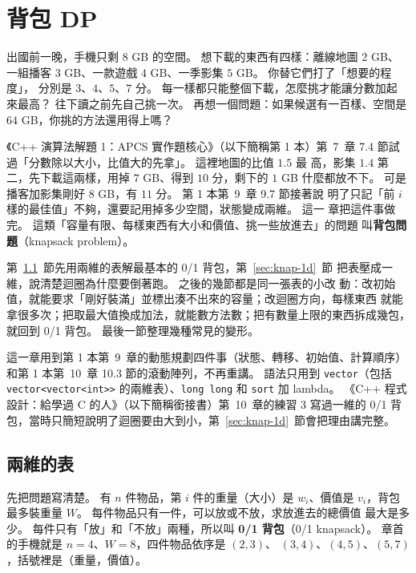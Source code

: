 \chapter{背包 DP}
\label{ch:knapsack}

出國前一晚，手機只剩 $8$ GB 的空間。 想下載的東西有四樣：離線地圖 $2$ GB、
一組播客 $3$ GB、一款遊戲 $4$ GB、一季影集 $5$ GB。 你替它們打了「想要的程度」，
分別是 $3$、$4$、$5$、$7$ 分。 每一樣都只能整個下載，怎麼挑才能讓分數加起
來最高？ 往下讀之前先自己挑一次。 再想一個問題：如果候選有一百樣、空間是
$64$ GB，你挑的方法還用得上嗎？

《C++ 演算法解題 1：APCS 實作題核心》（以下簡稱第 1 本）第~7~章 7.4 節試過「分數除以大小，比值大的先拿」。 這裡地圖的比值 $1.5$ 最
高，影集 $1.4$ 第二，先下載這兩樣，用掉 $7$ GB、得到 $10$ 分，剩下的 $1$ GB
什麼都放不下。 可是播客加影集剛好 $8$ GB，有 $11$ 分。 第 1 本第~9~章 9.7 節接著說
明了只記「前 $i$ 樣的最佳值」不夠，還要記用掉多少空間，狀態變成兩維。 這一
章把這件事做完。 這類「容量有限、每樣東西有大小和價值、挑一些放進去」的問題
叫\textbf{背包問題}（knapsack problem）。

第~\ref{sec:knap-01}~節先用兩維的表解最基本的 0/1 背包，第~\ref{sec:knap-1d}~節
把表壓成一維，說清楚迴圈為什麼要倒著跑。 之後的幾節都是同一張表的小改
動：改初始值，就能要求「剛好裝滿」並標出湊不出來的容量；改迴圈方向，每樣東西
就能拿很多次；把取最大值換成加法，就能數方法數；把有數量上限的東西拆成幾包，
就回到 0/1 背包。 最後一節整理幾種常見的變形。

這一章用到第 1 本第~9~章的動態規劃四件事（狀態、轉移、初始值、計算順序）和第 1 本第~10~章
10.3 節的滾動陣列，不再重講。 語法只用到 \texttt{vector}（包括
\texttt{vector<vector<int>>} 的兩維表）、\texttt{long long} 和 \texttt{sort}
加 lambda。 《C++ 程式設計：給學過 C 的人》（以下簡稱銜接書）第~10~章的練習 3
寫過一維的 0/1 背包，當時只簡短說明了迴圈要由大到小，第~\ref{sec:knap-1d}~節會把理由講完整。

\section{兩維的表}
\label{sec:knap-01}

先把問題寫清楚。 有 $n$ 件物品，第 $i$ 件的重量（大小）是 $w_i$、價值是
$v_i$，背包最多裝重量 $W$。 每件物品只有一件，可以放或不放，求放進去的總價值
最大是多少。 每件只有「放」和「不放」兩種，所以叫 \textbf{0/1 背包}（0/1
knapsack）。 章首的手機就是 $n = 4$、$W = 8$，四件物品依序是 $(2, 3)$、
$(3, 4)$、$(4, 5)$、$(5, 7)$，括號裡是（重量，價值）。

